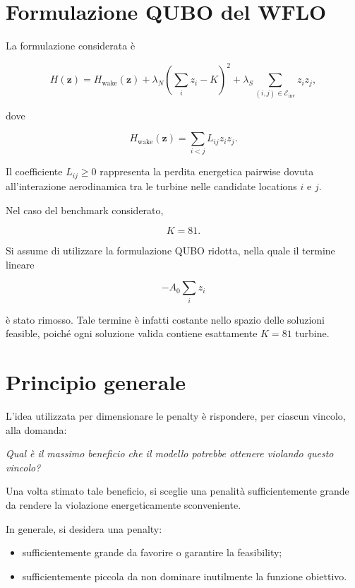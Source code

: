 \documentclass[11pt,a4paper]{report}
\begin{document}
\section{Formulazione QUBO del WFLO}

La formulazione considerata è

\[
H(\mathbf z)
=
H_{\mathrm{wake}}(\mathbf z)
+
\lambda_N
\left(
\sum_i z_i-K
\right)^2
+
\lambda_S
\sum_{(i,j)\in\mathcal E_{\mathrm{inv}}}
z_i z_j,
\]

dove

\[
H_{\mathrm{wake}}(\mathbf z)
=
\sum_{i<j}L_{ij}z_i z_j.
\]

Il coefficiente $L_{ij}\geq 0$ rappresenta la perdita energetica pairwise
dovuta all'interazione aerodinamica tra le turbine nelle candidate
locations $i$ e $j$.

Nel caso del benchmark considerato,

\[
K=81.
\]

Si assume di utilizzare la formulazione QUBO ridotta, nella quale il
termine lineare

\[
-A_0\sum_i z_i
\]

è stato rimosso. Tale termine è infatti costante nello spazio delle
soluzioni feasible, poiché ogni soluzione valida contiene esattamente
$K=81$ turbine.

\section{Principio generale}

L'idea utilizzata per dimensionare le penalty è rispondere, per ciascun
vincolo, alla domanda:

\begin{center}
\emph{Qual è il massimo beneficio che il modello potrebbe ottenere
violando questo vincolo?}
\end{center}

Una volta stimato tale beneficio, si sceglie una penalità sufficientemente
grande da rendere la violazione energeticamente sconveniente.

In generale, si desidera una penalty:

\begin{itemize}
    \item sufficientemente grande da favorire o garantire la feasibility;
    \item sufficientemente piccola da non dominare inutilmente la funzione
    obiettivo.
\end{itemize}
\end{document}
